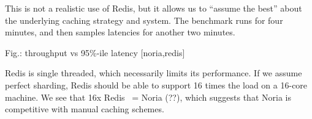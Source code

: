This is not a realistic use of Redis, but it allows us to ``assume the best''
about the underlying caching strategy and system. The benchmark runs for four
minutes, and then samples latencies for another two minutes.

Fig.: throughput vs 95\%-ile latency [noria,redis]

Redis is single threaded, which necessarily limits its performance. If we assume
perfect sharding, Redis should be able to support 16 times the load on a 16-core
machine. We see that 16x Redis ~= Noria (??), which suggests that Noria is
competitive with manual caching schemes.
